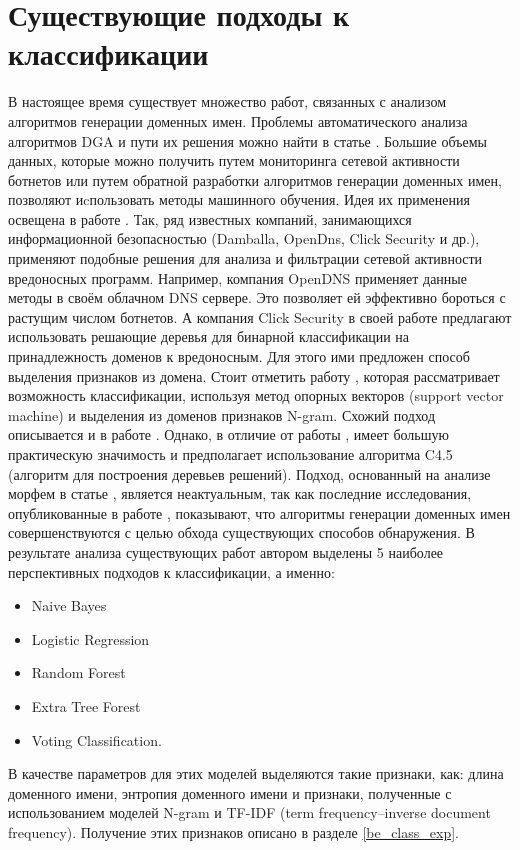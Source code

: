 \section{Существующие подходы к классификации}\label{be_class}
В настоящее время существует множество работ, связанных с анализом алгоритмов генерации доменных имен. Проблемы автоматического анализа алгоритмов DGA и пути их решения можно найти в статье \cite{Yadav}. Большие объемы данных, которые можно получить путем мониторинга сетевой активности ботнетов или путем обратной разработки алгоритмов генерации доменных имен, позволяют иcпользовать методы машинного обучения. Идея их применения освещена в работе \cite{Stevanovic}. Так, ряд известных компаний, занимающихся информационной безопасностью (Damballa, OpenDns, Click Security и др.), применяют подобные решения для анализа и фильтрации сетевой активности вредоносных программ. Например, компания OpenDNS применяет данные методы в своём облачном DNS сервере. Это позволяет ей эффективно бороться с растущим числом ботнетов. А компания Click Security в своей работе \cite{Click} предлагают использовать решающие деревья для бинарной классификации на принадлежность доменов к вредоносным. Для этого ими предложен способ выделения признаков из домена. Стоит отметить работу \cite{Davuth}, которая рассматривает возможность классификации, используя метод опорных векторов (support vector machine) и выделения из доменов признаков N-gram. Схожий подход описывается и в работе \cite{Jacobs}. Однако, в отличие от работы \cite{Davuth}, имеет большую практическую значимость и предполагает использование алгоритма C4.5 (алгоритм для построения деревьев решений). Подход, основанный на анализе морфем в статье \cite{Wei}, является неактуальным, так как последние исследования, опубликованные в работе \cite{Raff}, показывают, что алгоритмы генерации доменных имен совершенствуются с целью обхода существующих способов обнаружения. В результате анализа существующих работ автором выделены 5 наиболее перспективных подходов к классификации, а именно:
\begin{itemize}
\item Naive Bayes
\item Logistic Regression
\item Random Forest
\item Extra Tree Forest
\item Voting Classification.
\end{itemize}

В качестве параметров для этих моделей выделяются такие признаки, как: длина доменного имени, энтропия доменного имени и признаки, полученные с использованием моделей N-gram и TF-IDF (term frequency–inverse document frequency).
Получение этих признаков описано в разделе \ref{be_class_exp}.
\clearpage

